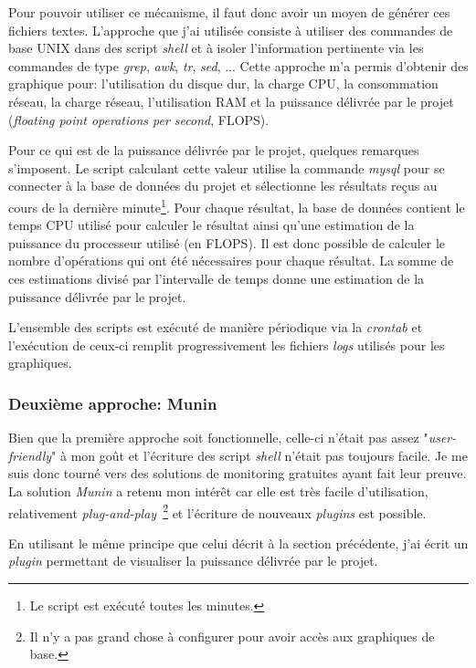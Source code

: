 \documentclass[a4paper, 11pt]{article}
\begin{document}
Pour pouvoir utiliser ce mécanisme, il faut donc avoir un moyen de générer ces fichiers textes. L'approche que j'ai utilisée consiste à utiliser des commandes de base UNIX dans des script \textit{shell} et à isoler l'information pertinente via les commandes de type \textit{grep}, \textit{awk}, \textit{tr}, \textit{sed}, ... Cette approche m'a permis d'obtenir des graphique pour: l'utilisation du disque dur, la charge CPU, la consommation réseau, la charge réseau, l'utilisation RAM et la puissance délivrée par le projet (\textit{floating point operations per second}, FLOPS).

Pour ce qui est de la puissance délivrée par le projet, quelques remarques s'imposent. Le script calculant cette valeur utilise la commande \textit{mysql} pour se connecter à la base de données du projet et sélectionne les résultats reçus au cours de la dernière minute\footnote{Le script est exécuté toutes les minutes.}. Pour chaque résultat, la base de données contient le temps CPU utilisé pour calculer le résultat ainsi qu'une estimation de la puissance du processeur utilisé (en FLOPS). Il est donc possible de calculer le nombre d'opérations qui ont été nécessaires pour chaque résultat. La somme de ces estimations divisé par l'intervalle de temps donne une estimation de la puissance délivrée par le projet.

L'ensemble des scripts est exécuté de manière périodique via la \textit{crontab} et l'exécution de ceux-ci remplit progressivement les fichiers \textit{logs} utilisés pour les graphiques.

\subsubsection{Deuxième approche: Munin}
Bien que la première approche soit fonctionnelle, celle-ci n'était pas assez "\textit{user-friendly}" à mon goût et l'écriture des script \textit{shell} n'était pas toujours facile. Je me suis donc tourné vers des solutions de monitoring gratuites ayant fait leur preuve. La solution \textit{Munin} a retenu mon intérêt car elle est très facile d'utilisation, relativement \textit{plug-and-play}~\footnote{Il n'y a pas grand chose à configurer pour avoir accès aux graphiques de base.} et l'écriture de nouveaux \textit{plugins} est possible.%

En utilisant le même principe que celui décrit à la section précédente, j'ai écrit un \textit{plugin} permettant de visualiser la puissance délivrée par le projet.
\end{document}
